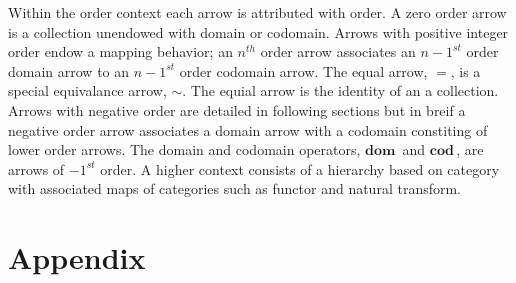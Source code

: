 \documentclass[aps,twocolumn,secnumarabic,nobalancelastpage,amsmath,amssymb,
amsthm,nofootinbib,parskip=full]{revtex4}
\numberwithin{equation}{section}
\newcommand{\oper}[1]{\mathbf{#1}\,}
\begin{document}
Within the order context each arrow is attributed with order.
A zero order arrow is a collection unendowed with domain or codomain. 
Arrows with positive integer order endow a mapping behavior;
an $n^{th}$ order arrow associates an $n-1^{st}$ order domain arrow to an
$n-1^{st}$ order codomain arrow.
The equal arrow, $=$, is a special equivalance arrow, $\sim$.
The equial arrow is the identity of an a collection.
Arrows with negative order
are detailed in following sections but in breif a negative order arrow
associates a domain arrow with a codomain constiting of
lower order arrows. The domain and codomain operators, $\oper{dom}$ and
$\oper{cod}$, are arrows of $-1^{st}$ order.
A higher context consists of a hierarchy based on category with
associated maps of categories such as functor and natural transform.




\section{Appendix}


\end{document}
